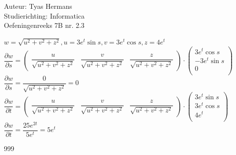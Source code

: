 \documentclass[a4paper]{article}
\begin{document}
  
\noindent \large Auteur: Tyas Hermans \\
\noindent \large Studierichting: Informatica\\
\noindent \large Oefeningenreeks 7B nr. 2.3\\

\medskip

\normalsize

$w = \sqrt{u^2+v^2+z^2}, u = 3e^t\sin s, v = 3e^t\cos s, z = 4e^t$\\

$\dfrac{\partial w}{\partial s} =\left(
\begin{array}{ccc}
\dfrac{u}{\sqrt{u^2+v^2+z^2}} & \dfrac{v}{\sqrt{u^2+v^2+z^2}} & \dfrac{z}{\sqrt{u^2+v^2+z^2}}
\end{array}
\right) \cdot \left(
\begin{array}{ccc}
3e^t\cos s\\
-3e^t\sin s\\
0\\
\end{array}
\right)$ \\

$\dfrac{\partial w}{\partial s} = \dfrac{0}{\sqrt{u^2+v^2+z^2}} = 0$\\

$\dfrac{\partial w}{\partial t} =\left(
\begin{array}{ccc}
\dfrac{u}{\sqrt{u^2+v^2+z^2}} & \dfrac{v}{\sqrt{u^2+v^2+z^2}} & \dfrac{z}{\sqrt{u^2+v^2+z^2}}
\end{array}
\right) \cdot \left(
\begin{array}{ccc}
3e^t\sin s\\
3e^t\cos s\\
4e^t\\
\end{array}
\right)$ \\

$\dfrac{\partial w}{\partial t} = \dfrac{25e^{2t}}{5e^t} = 5e^t$\\



\begin{thebibliography}{999}
\end{thebibliography}
\end{document}
